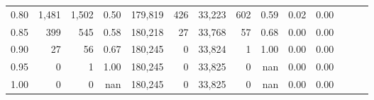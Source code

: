 \begin{tabular}{rrrrrrrrrrrrrr}
0.80 &   1,481 &  1,502 &  0.50 &  179,819 &      426 &  33,223 &     602 &  0.59 &  0.02 &      0.00 \\
0.85 &     399 &    545 &  0.58 &  180,218 &       27 &  33,768 &      57 &  0.68 &  0.00 &      0.00 \\
0.90 &      27 &     56 &  0.67 &  180,245 &        0 &  33,824 &       1 &  1.00 &  0.00 &      0.00 \\
0.95 &       0 &      1 &  1.00 &  180,245 &        0 &  33,825 &       0 &   nan &  0.00 &      0.00 \\
1.00 &       0 &      0 &   nan &  180,245 &        0 &  33,825 &       0 &   nan &  0.00 &      0.00 \\
\bottomrule
\end{tabular}
